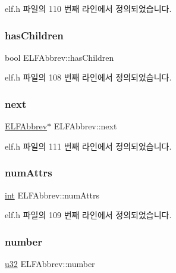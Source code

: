 elf.\+h 파일의 110 번째 라인에서 정의되었습니다.

\mbox{\label{struct_e_l_f_abbrev_ad82152aad0444c5b98f5194bd0dfbc15}} 
\subsubsection{\texorpdfstring{has\+Children}{hasChildren}}
{\footnotesize\ttfamily bool E\+L\+F\+Abbrev\+::has\+Children}



elf.\+h 파일의 108 번째 라인에서 정의되었습니다.

\mbox{\label{struct_e_l_f_abbrev_a95ecd80ddef4fe77a44c0762725c06dc}} 
\subsubsection{\texorpdfstring{next}{next}}
{\footnotesize\ttfamily \mbox{\hyperlink{struct_e_l_f_abbrev}{E\+L\+F\+Abbrev}}$\ast$ E\+L\+F\+Abbrev\+::next}



elf.\+h 파일의 111 번째 라인에서 정의되었습니다.

\mbox{\label{struct_e_l_f_abbrev_a5604c4d3d6d4e3beaf6cbbe7bdf8bd66}} 
\subsubsection{\texorpdfstring{num\+Attrs}{numAttrs}}
{\footnotesize\ttfamily \mbox{\hyperlink{_util_8cpp_a0ef32aa8672df19503a49fab2d0c8071}{int}} E\+L\+F\+Abbrev\+::num\+Attrs}



elf.\+h 파일의 109 번째 라인에서 정의되었습니다.

\mbox{\label{struct_e_l_f_abbrev_a6b68af30db320e5db907501097c3b329}} 
\subsubsection{\texorpdfstring{number}{number}}
{\footnotesize\ttfamily \mbox{\hyperlink{_system_8h_a10e94b422ef0c20dcdec20d31a1f5049}{u32}} E\+L\+F\+Abbrev\+::number}



